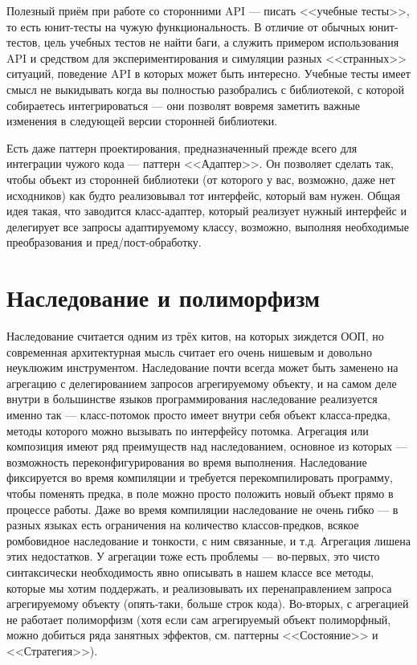 \documentclass{../../text-style}
\begin{document}
Полезный приём при работе со сторонними API --- писать <<учебные тесты>>, то есть юнит-тесты на чужую функциональность. В отличие от обычных юнит-тестов, цель учебных тестов не найти баги, а служить примером использования API и средством для экспериментирования и симуляции разных <<странных>> ситуаций, поведение API в которых может быть интересно. Учебные тесты имеет смысл не выкидывать когда вы полностью разобрались с библиотекой, с которой собираетесь интегрироваться --- они позволят вовремя заметить важные изменения в следующей версии сторонней библиотеки.

Есть даже паттерн проектирования, предназначенный прежде всего для интеграции чужого кода --- паттерн <<Адаптер>>. Он позволяет сделать так, чтобы объект из сторонней библиотеки (от которого у вас, возможно, даже нет исходников) как будто реализовывал тот интерфейс, который вам нужен. Общая идея такая, что заводится класс-адаптер, который реализует нужный интерфейс и делегирует все запросы адаптируемому классу, возможно, выполняя необходимые преобразования и пред/пост-обработку.

\section{Наследование и полиморфизм}

Наследование считается одним из трёх китов, на которых зиждется ООП, но современная архитектурная мысль считает его очень нишевым и довольно неуклюжим инструментом. Наследование почти всегда может быть заменено на агрегацию с делегированием запросов агрегируемому объекту, и на самом деле внутри в большинстве языков программирования наследование реализуется именно так --- класс-потомок просто имеет внутри себя объект класса-предка, методы которого можно вызывать по интерфейсу потомка. Агрегация или композиция имеют ряд преимуществ над наследованием, основное из которых --- возможность переконфигурирования во время выполнения. Наследование фиксируется во время компиляции и требуется перекомпилировать программу, чтобы поменять предка, в поле можно просто положить новый объект прямо в процессе работы. Даже во время компиляции наследование не очень гибко --- в разных языках есть ограничения на количество классов-предков, всякое ромбовидное наследование и тонкости, с ним связанные, и т.д. Агрегация лишена этих недостатков. У агрегации тоже есть проблемы --- во-первых, это чисто синтаксически необходимость явно описывать в нашем классе все методы, которые мы хотим поддержать, и реализовывать их перенаправлением запроса агрегируемому объекту (опять-таки, больше строк кода). Во-вторых, с агрегацией не работает полиморфизм (хотя если сам агрегируемый объект полиморфный, можно добиться ряда занятных эффектов, см. паттерны <<Состояние>> и <<Стратегия>>).
\end{document}
